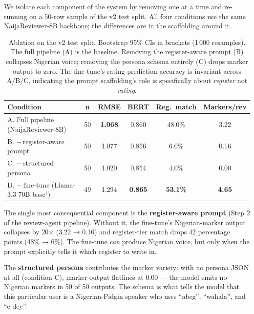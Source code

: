 \documentclass[sigconf,nonacm,balance]{acmart}
\begin{document}
We isolate each component of the system by removing one at a time and
re-running on a 50-row sample of the v2 test split. All four conditions
use the same NaijaReviewer-8B backbone; the differences are in the
scaffolding around it.

\begin{table}[t]
\caption{Ablation on the v2 test split. Bootstrap 95\% CIs in brackets
         (1\,000 resamples). The full pipeline (A) is the baseline.
         Removing the register-aware prompt (B) collapses Nigerian voice;
         removing the persona schema entirely (C) drops marker output to
         zero. The fine-tune's rating-prediction accuracy is invariant
         across A/B/C, indicating the prompt scaffolding's role is
         specifically about \emph{register} not \emph{rating}.}
\label{tab:ablation}
\small
\begin{tabular}{lccccc}
\toprule
\textbf{Condition} & \textbf{n} & \textbf{RMSE} & \textbf{BERT} &
\textbf{Reg.\ match} & \textbf{Markers/rev} \\
\midrule
A. Full pipeline (NaijaReviewer-8B)        & 50 & \textbf{1.068} & 0.860 & 48.0\%          & 3.22 \\
B. $-$\,register-aware prompt              & 50 & 1.077 & 0.856 & 6.0\%           & 0.16 \\
C. $-$\,structured persona                 & 50 & 1.020 & 0.854 & 4.0\%           & 0.00 \\
D. $-$\,fine-tune (Llama-3.3 70B base$^\dagger$)     & 49 & 1.294 & \textbf{0.865} & \textbf{53.1\%} & \textbf{4.65} \\
\bottomrule
\end{tabular}
\end{table}

The single most consequential component is the \textbf{register-aware
prompt} (Step 2 of the review-agent pipeline). Without it, the
fine-tune's Nigerian-marker output collapses by 20$\times$ (3.22 →
0.16) and register-tier match drops 42 percentage points (48\% → 6\%).
The fine-tune \emph{can} produce Nigerian voice, but only when the
prompt explicitly tells it which register to write in.

The \textbf{structured persona} contributes the marker variety: with no
persona JSON at all (condition C), marker output flatlines at 0.00 ---
the model emits no Nigerian markers in 50 of 50 outputs. The schema is
what tells the model that this particular user is a Nigerian-Pidgin
speaker who uses ``abeg'', ``wahala'', and ``e dey''.
\end{document}
